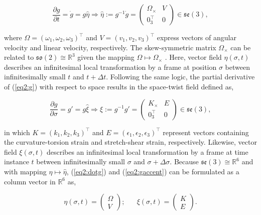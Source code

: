 \begin{equation}
    \frac{\partial g}{\partial t} = \dot{g} = g\hat{\eta} \Longrightarrow \hat{\eta} := g^{-1}\dot{g} = \begin{pmatrix} \Omega_\times & V \\ 0_3^\top & 0 \end{pmatrix} \in  \mathfrak{se}(3),
    \label{eq2:dotg}
\end{equation}

where $\Omega = (\omega_1,\omega_2,\omega_3)^\top$ and $V = (v_1,v_2,v_3)^\top$ express vectors of angular velocity and linear velocity, respectively. The skew-symmetric matrix $\Omega_\times$ can be related to $\mathfrak{so}(2) \cong \mathbb{R}^3$ given the mapping $\Omega \mapsto \Omega_\times$ \cite{Sola2018}. Here, vector field $\eta(\sigma,t)$ describes an infinitesimal local transformation by a frame at position $\sigma$ between infinitesimally small $t$ and $t+\Delta t$. Following the same logic, the partial derivative of (\ref{eq2:g}) with respect to space results in the space-twist field defined as,


\begin{equation}
   \frac{\partial g}{\partial \sigma} =  g' = g\hat{\xi} \Longrightarrow \hat{\xi} := g^{-1}g' = \begin{pmatrix} K_\times & E \\ 0_3^\top & 0 \end{pmatrix} \in  \mathfrak{se}(3),
    \label{eq2:gaccent}
\end{equation}

in which $K = (k_1,k_2,k_3)^\top$ and $E = (\epsilon_1,\epsilon_2,\epsilon_3)^\top$ represent vectors containing the curvature-torsion strain and stretch-shear strain, respectively. Likewise, vector field $\xi(\sigma,t)$ describes an infinitesimal local transformation by a frame at time instance $t$ between infinitesimally small $\sigma$ and $\sigma+\Delta \sigma$. Because $\mathfrak{se}(3) \cong \mathbb{R}^6$ and with mapping $\eta \mapsto \hat{\eta}$, (\ref{eq2:dotg}) and (\ref{eq2:gaccent}) can be formulated as a column vector in $\mathbb{R}^6$ as,


\begin{equation}
    \eta(\sigma,t) = \begin{pmatrix} \Omega \\ V \end{pmatrix}; \hspace{20pt} \xi(\sigma,t) = \begin{pmatrix} K \\ E \end{pmatrix}.
    \label{eq2:etaxi}
\end{equation}




